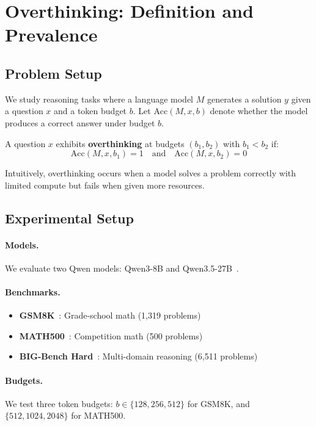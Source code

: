 \section{Overthinking: Definition and Prevalence}

\subsection{Problem Setup}

We study reasoning tasks where a language model $M$ generates a solution $y$ given a question $x$ and a token budget $b$.
Let $\text{Acc}(M, x, b)$ denote whether the model produces a correct answer under budget $b$.

\begin{definition}[Overthinking]
A question $x$ exhibits \textbf{overthinking} at budgets $(b_1, b_2)$ with $b_1 < b_2$ if:
$$\text{Acc}(M, x, b_1) = 1 \quad \text{and} \quad \text{Acc}(M, x, b_2) = 0$$
\end{definition}

Intuitively, overthinking occurs when a model solves a problem correctly with limited compute but fails when given more resources.

\subsection{Experimental Setup}

\paragraph{Models.} We evaluate two Qwen models: Qwen3-8B and Qwen3.5-27B~\cite{qwen2024}.

\paragraph{Benchmarks.}
\begin{itemize}[nosep]
\item \textbf{GSM8K}~\cite{cobbe2021gsm8k}: Grade-school math (1,319 problems)
\item \textbf{MATH500}~\cite{hendrycks2021math}: Competition math (500 problems)
\item \textbf{BIG-Bench Hard}~\cite{suzgun2022bbh}: Multi-domain reasoning (6,511 problems)
\end{itemize}

\paragraph{Budgets.} We test three token budgets: $b \in \{128, 256, 512\}$ for GSM8K, and $\{512, 1024, 2048\}$ for MATH500.

